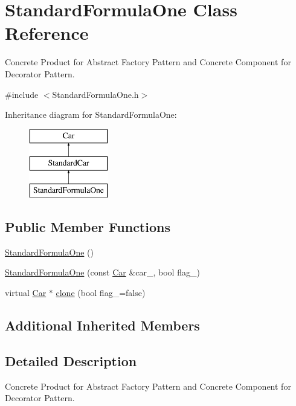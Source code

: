 \hypertarget{class_standard_formula_one}{}\section{Standard\+Formula\+One Class Reference}
\label{class_standard_formula_one}


Concrete Product for Abstract Factory Pattern and Concrete Component for Decorator Pattern.  




{\ttfamily \#include $<$Standard\+Formula\+One.\+h$>$}

Inheritance diagram for Standard\+Formula\+One\+:\begin{figure}[H]
\begin{center}
\leavevmode
\includegraphics[height=3.000000cm]{class_standard_formula_one}
\end{center}
\end{figure}
\subsection*{Public Member Functions}
\begin{DoxyCompactItemize}
\item 
\mbox{\hyperlink{class_standard_formula_one_ac72e5d9c1c5a17f68df5e423d59b6490}{Standard\+Formula\+One}} ()
\item 
\mbox{\hyperlink{class_standard_formula_one_a49e6ebbbfb70b6fcf039de1dd57b4915}{Standard\+Formula\+One}} (const \mbox{\hyperlink{class_car}{Car}} \&car\+\_\+, bool flag\+\_\+)
\item 
virtual \mbox{\hyperlink{class_car}{Car}} $\ast$ \mbox{\hyperlink{class_standard_formula_one_acd27c9ec96a7410d40c72666d36b6a7e}{clone}} (bool flag\+\_\+=false)
\end{DoxyCompactItemize}
\subsection*{Additional Inherited Members}


\subsection{Detailed Description}
Concrete Product for Abstract Factory Pattern and Concrete Component for Decorator Pattern. 

